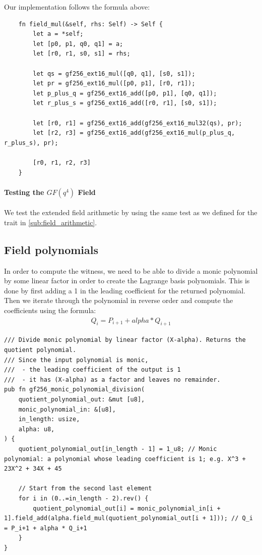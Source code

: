 \documentclass[11pt]{report}
\theoremstyle{definition}
\theoremstyle{plain}
\begin{document}
Our implementation follows the formula above:
\begin{verbatim}
    fn field_mul(&self, rhs: Self) -> Self {
        let a = *self;
        let [p0, p1, q0, q1] = a;
        let [r0, r1, s0, s1] = rhs;

        let qs = gf256_ext16_mul([q0, q1], [s0, s1]);
        let pr = gf256_ext16_mul([p0, p1], [r0, r1]);
        let p_plus_q = gf256_ext16_add([p0, p1], [q0, q1]);
        let r_plus_s = gf256_ext16_add([r0, r1], [s0, s1]);

        let [r0, r1] = gf256_ext16_add(gf256_ext16_mul32(qs), pr);
        let [r2, r3] = gf256_ext16_add(gf256_ext16_mul(p_plus_q, r_plus_s), pr);

        [r0, r1, r2, r3]
    }
\end{verbatim}

\paragraph{Testing the $GF(q^4)$ Field}
We test the extended field arithmetic by using the same test as we defined for the trait in \autoref{sub:field_arithmetic}.


\subsection{Field polynomials}\label{sub:field_polynomials} %
In order to compute the witness, we need to be able to divide a monic polynomial by some linear factor in order to create the Lagrange basis polynomials.
This is done by first adding a 1 in the leading coefficient for the returned polynomial. Then we iterate through the polynomial in reverse order and compute the coefficients using the formula:
\begin{align}
  Q_i = P_{i+1} + alpha * Q_{i+1}
\end{align}
\begin{verbatim}
/// Divide monic polynomial by linear factor (X-alpha). Returns the quotient polynomial. 
/// Since the input polynomial is monic, 
///  - the leading coefficient of the output is 1 
///  - it has (X-alpha) as a factor and leaves no remainder.
pub fn gf256_monic_polynomial_division(
    quotient_polynomial_out: &mut [u8],
    monic_polynomial_in: &[u8],
    in_length: usize,
    alpha: u8,
) {
    quotient_polynomial_out[in_length - 1] = 1_u8; // Monic polynomial: a polynomial whose leading coefficient is 1; e.g. X^3 + 23X^2 + 34X + 45

    // Start from the second last element
    for i in (0..=in_length - 2).rev() {
        quotient_polynomial_out[i] = monic_polynomial_in[i + 1].field_add(alpha.field_mul(quotient_polynomial_out[i + 1])); // Q_i = P_i+1 + alpha * Q_i+1
    }
}
\end{verbatim}
\end{document}
